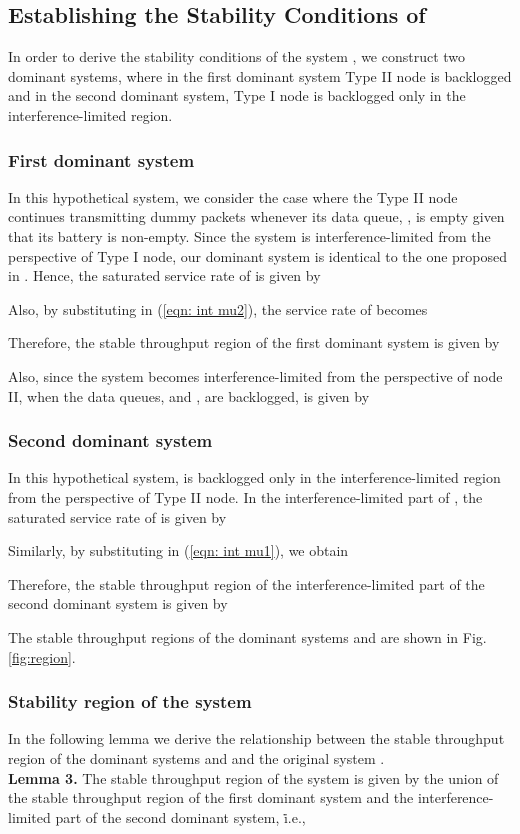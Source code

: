 \documentclass[draftcls,12pt,onecolumn]{IEEEtran}
\begin{document}
\subsection{Establishing the Stability Conditions of } \label{subsec: conditions}
In order to derive the stability conditions of the system , we construct two dominant systems, where in the first dominant system Type II node is backlogged and in the second dominant system, Type I node is backlogged only in the interference-limited region. \subsubsection{First dominant system}
\indent In this hypothetical system, we consider the case where the Type II node continues transmitting dummy packets whenever its data queue, , is empty given that its battery is non-empty. Since the system is interference-limited from the perspective of Type I node, our dominant system is identical to the one proposed in \cite{rao1988stability}. Hence, the saturated service rate of  is given by

Also, by substituting  in (\ref{eqn: int mu2}), the service rate of  becomes

Therefore, the stable throughput region of the first dominant system  is given by 


Also, since the system becomes interference-limited from the perspective of node II, when the data queues,  and , are backlogged,  is given by 

\subsubsection{Second dominant system}
\indent In this hypothetical system,  is backlogged only in the interference-limited region from the perspective of Type II node. In the interference-limited part of , the saturated service rate of  is given by 

Similarly, by substituting  in (\ref{eqn: int mu1}), we obtain 

Therefore, the stable throughput region of the interference-limited part of the second dominant system is given by 

The stable throughput regions of the dominant systems  and  are shown in Fig. \ref{fig:region}. 
\subsubsection{Stability region of the system }
In the following lemma we derive the relationship between the stable throughput region of the dominant systems  and  and the original system .\\ 
\indent \textbf{Lemma 3.} The stable throughput region  of the system  is given by the union of the stable throughput region of the first dominant system and the interference-limited part of the second dominant system, \.i.e., 
\end{document}
